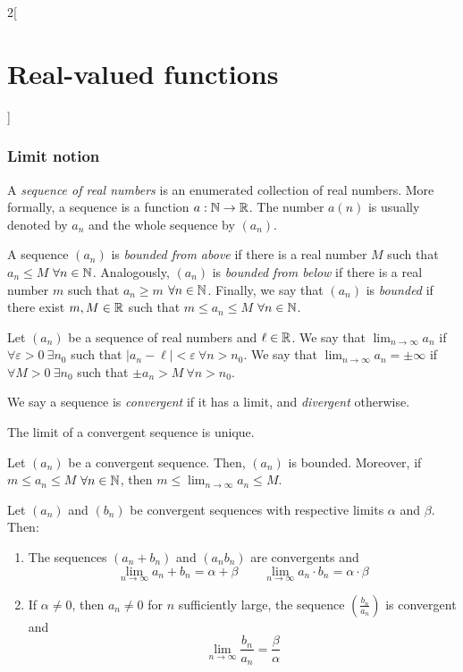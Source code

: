 \documentclass[../../../main_math.tex]{subfiles}
\begin{document}
\begin{multicols}{2}[\section{Real-valued functions}]
  \subsubsection{Limit notion}
  \begin{definition}
    A \emph{sequence of real numbers} is an enumerated collection of real numbers. More formally, a sequence is a function $a:\mathbb{N}\rightarrow\mathbb{R}$. The number $a(n)$ is usually denoted by $a_n$ and the whole sequence by $(a_n)$.
  \end{definition}
  \begin{definition}
    A sequence $(a_n)$ is \emph{bounded from above} if there is a real number $M$ such that $a_n\leq M$ $\forall n\in\mathbb{N}$.
    Analogously, $(a_n)$ is \emph{bounded from below} if there is a real number $m$ such that $a_n\geq m$ $\forall n\in\mathbb{N}$.
    Finally, we say that $(a_n)$ is \emph{bounded} if there exist $m,M\in\mathbb{R}$ such that $m\leq a_n\leq M$ $\forall n\in\mathbb{N}$.
  \end{definition}
  \begin{definition}[Limit]
    Let $(a_n)$ be a sequence of real numbers and $\ell\in\mathbb{R}$. We say that $\displaystyle\lim_{n\to\infty} a_n$ if $\forall\varepsilon>0\ \exists n_0$ such that $|a_n-\ell|<\varepsilon\ \forall n>n_0$.
    We say that $\displaystyle\lim_{n\to\infty} a_n=\pm\infty$ if $\forall M>0\ \exists n_0$ such that $\pm a_n>M\ \forall n>n_0$.
  \end{definition}
  \begin{definition}
    We say a sequence is \emph{convergent} if it has a limit, and \emph{divergent} otherwise.
  \end{definition}
  \begin{lemma}
    The limit of a convergent sequence is unique.
  \end{lemma}
  \begin{lemma}
    Let $(a_n)$ be a convergent sequence. Then, $(a_n)$ is bounded. Moreover, if $m\leq a_n\leq M$ $\forall n\in\mathbb{N}$, then $\displaystyle m\leq \lim_{n\to\infty} a_n\leq M$.
  \end{lemma}
  \begin{lemma}
    Let $(a_n)$ and $(b_n)$ be convergent sequences with respective limits $\alpha$ and $\beta$. Then:
    \begin{enumerate}
      \item The sequences $(a_n+b_n)$ and $(a_nb_n)$ are convergents and $$\lim_{n\to\infty} a_n+b_n=\alpha+\beta\qquad\lim_{n\to\infty} a_n\cdot b_n=\alpha\cdot \beta$$
      \item If $\alpha\ne 0$, then $a_n\ne 0$ for $n$ sufficiently large, the sequence $\displaystyle\left(\frac{b_n}{a_n}\right)$ is convergent and $$\lim_{n\to\infty}\frac{b_n}{a_n}=\frac{\beta}{\alpha}$$

\end{enumerate}
\end{lemma}
\end{multicols}
\end{document}
